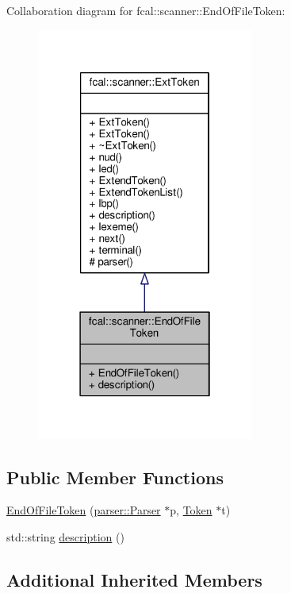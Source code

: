Collaboration diagram for fcal\+:\+:scanner\+:\+:End\+Of\+File\+Token\+:
\nopagebreak
\begin{figure}[H]
\begin{center}
\leavevmode
\includegraphics[width=202pt]{classfcal_1_1scanner_1_1EndOfFileToken__coll__graph}
\end{center}
\end{figure}
\subsection*{Public Member Functions}
\begin{DoxyCompactItemize}
\item 
\hyperlink{classfcal_1_1scanner_1_1EndOfFileToken_a275106595ca3f5a46c80efb281021f2b}{End\+Of\+File\+Token} (\hyperlink{classfcal_1_1parser_1_1Parser}{parser\+::\+Parser} $\ast$p, \hyperlink{classfcal_1_1scanner_1_1Token}{Token} $\ast$t)
\item 
std\+::string \hyperlink{classfcal_1_1scanner_1_1EndOfFileToken_a8fdfe21df812622405e5b7814970f367}{description} ()
\end{DoxyCompactItemize}
\subsection*{Additional Inherited Members}


